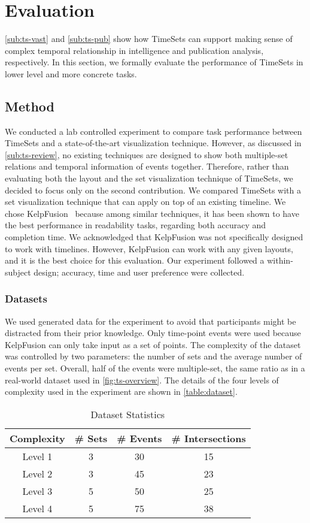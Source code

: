 \section{Evaluation}
\autoref{sub:ts-vast} and \autoref{sub:ts-pub} show how TimeSets can support making sense of complex temporal relationship in intelligence and publication analysis, respectively. In this section, we formally evaluate the performance of TimeSets in lower level and more concrete tasks.

\subsection{Method}
We conducted a lab controlled experiment to compare task performance between TimeSets and a state-of-the-art visualization technique. However, as discussed in \autoref{sub:ts-review}, no existing techniques are designed to show both multiple-set relations and temporal information of events together. Therefore, rather than evaluating both the layout and the set visualization technique of TimeSets, we decided to focus only on the second contribution. We compared TimeSets with a set visualization technique that can apply on top of an existing timeline. We chose KelpFusion~\cite{Meulemans2013} because among similar techniques, it has been shown to have the best performance in readability tasks, regarding both accuracy and completion time. We acknowledged that KelpFusion was not specifically designed to work with timelines. However, KelpFusion can work with any given layouts, and it is the best choice for this evaluation. Our experiment followed a within-subject design; accuracy, time and user preference were collected.

\subsubsection{Datasets}
We used generated data for the experiment to avoid that participants might be distracted from their prior knowledge. Only time-point events were used because KelpFusion can only take input as a set of points. The complexity of the dataset was controlled by two parameters: the number of sets and the average number of events per set. Overall, half of the events were multiple-set, the same ratio as in a real-world dataset used in \autoref{fig:ts-overview}. The details of the four levels of complexity used in the experiment are shown in \autoref{table:dataset}.

\begin{table}[!htb]
\centering
\sffamily\small
\caption{Dataset Statistics}
\label{table:dataset}
\begin{tabular}{cccc}
	\toprule
	\textbf{Complexity} & \textbf{\# Sets} & \textbf{\# Events} & \textbf{\# Intersections} \\
	\midrule
	Level 1 & 3 & 30 & 15 \\
	Level 2 & 3 & 45 & 23 \\
	Level 3 & 5 & 50 & 25 \\
	Level 4 & 5 & 75 & 38 \\
	\bottomrule
\end{tabular}
\end{table}

